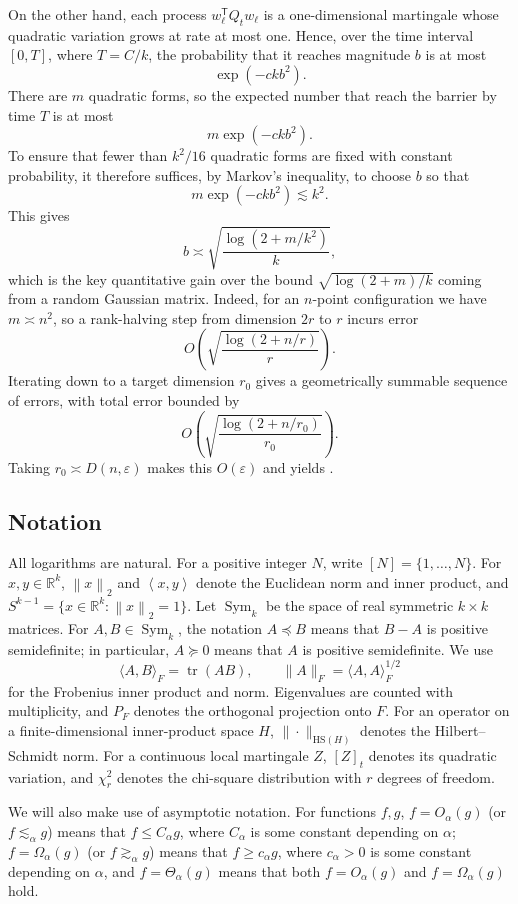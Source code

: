 \documentclass[11pt,reqno,letterpaper]{amsart}
\newcommand{\R}{\mathbb R}
\newcommand{\Sym}{\operatorname{Sym}}
\newcommand{\tr}{\operatorname{tr}}
\newcommand{\norm}[1]{\left\lVert #1\right\rVert_2}
\newcommand{\ip}[2]{\left\langle #1,#2\right\rangle}
\newcommand{\Dfun}[2]{D(#1,#2)}
\begin{document}
On the other hand, each process $w_\ell^{\mathsf T}Q_tw_\ell$ is a
one-dimensional martingale whose quadratic variation grows at rate at
most one. Hence, over the time interval $[0,T]$, where $T=C/k$, the
probability that it reaches magnitude $b$ is at most
\[
 \exp(-c k b^2).
\]
There are $m$ quadratic forms, so the expected number that reach the
barrier by time $T$ is at most
\[
 m\exp(-c k b^2).
\]
To ensure that fewer than $k^2/16$ quadratic forms are fixed with
constant probability, it therefore suffices, by Markov's inequality, to
choose $b$ so that
\[
 m\exp(-c k b^2)\lesssim k^2.
\]
This gives
\[
 b
 \asymp
 \sqrt{\frac{\log(2+m/k^2)}{k}},
\]
which is the key quantitative gain over the bound
$\sqrt{\log(2+m)/k}$ coming from a random Gaussian matrix. Indeed, for
an $n$-point configuration we have $m\asymp n^2$, so a rank-halving
step from dimension $2r$ to $r$ incurs error
\[
 O\left(
 \sqrt{\frac{\log(2+n/r)}{r}}
 \right).
\]
Iterating down to a target dimension $r_0$ gives a geometrically
summable sequence of errors, with total error bounded by
\[
 O\left(
 \sqrt{\frac{\log(2+n/r_0)}{r_0}}
 \right).
\]
Taking $r_0\asymp\Dfun{n}{\varepsilon}$ makes this $O(\varepsilon)$
and yields .

\subsection{Notation}
All logarithms are natural.  For a positive integer $N$, write
$[N]=\{1,\ldots,N\}$.  For $x,y\in\R^k$, $\norm{x}$ and $\ip{x}{y}$ denote the Euclidean norm
and inner product, and
$S^{k-1}=\{x\in\R^k:\norm{x}=1\}$.  Let $\Sym_k$ be the space of real
symmetric $k\times k$ matrices.  For $A,B\in\Sym_k$, the notation
$A\preceq B$ means that $B-A$ is positive semidefinite; in particular,
$A\succeq0$ means that $A$ is positive semidefinite.  We use
\[
 \langle A,B\rangle_F=\tr(AB),
 \qquad
 \|A\|_F=\langle A,A\rangle_F^{1/2}
\]
for the Frobenius inner product and norm.  Eigenvalues are counted with
multiplicity, and $P_F$ denotes the orthogonal projection onto $F$.
For an operator on a
finite-dimensional inner-product space $H$, $\|\cdot\|_{\mathrm{HS}(H)}$
denotes the Hilbert--Schmidt norm.  For a continuous local martingale
$Z$, $[Z]_t$ denotes its quadratic variation, and $\chi_r^2$ denotes the
chi-square distribution with $r$ degrees of freedom.

We will also make use of asymptotic notation. For functions $f,g$, $f = O_{\alpha}(g)$ (or $f\lesssim_{\alpha} g$) means that $f \le C_\alpha g$, where $C_\alpha$ is some constant depending on $\alpha$; $f = \Omega_{\alpha}(g)$ (or $f \gtrsim_{\alpha} g$) means that $f \ge c_{\alpha} g$, where $c_\alpha > 0$ is some constant depending on $\alpha$, and $f = \Theta_{\alpha}(g)$ means that both $f = O_{\alpha}(g)$ and $f = \Omega_{\alpha}(g)$ hold. 
\end{document}
